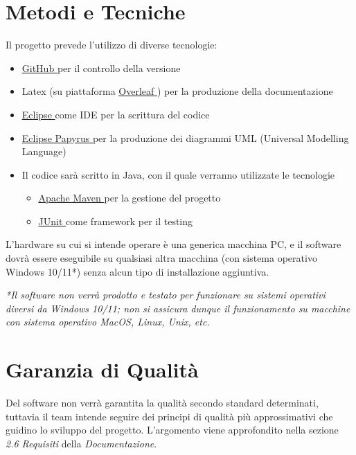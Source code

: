 \documentclass{article}
\begin{document}
\section{Metodi e Tecniche}
Il progetto prevede l'utilizzo di diverse tecnologie:
\begin{itemize}
    \item \href{http://www.github.com}{\underline{GitHub} \faExternalLink} per il controllo della versione
    \item Latex (su piattaforma \href{https://www.overleaf.com}{\underline{Overleaf} \faExternalLink}) per la produzione della documentazione
    \item \href{https://eclipseide.org/}{\underline{Eclipse} \faExternalLink} come IDE per la scrittura del codice 
    \item \href{https://eclipse.dev/papyrus/}{\underline{Eclipse Papyrus} \faExternalLink} per la produzione dei diagrammi UML (Universal Modelling Language)
    \item Il codice sarà scritto in Java, con il quale verranno utilizzate le tecnologie 
    \begin{itemize}
        \item \href{https://maven.apache.org/}{\underline{Apache Maven} \faExternalLink} per la gestione del progetto 
        \item \href{https://junit.org/junit5/}{\underline{JUnit} \faExternalLink} come framework per il testing 
    \end{itemize}
\end{itemize}
L'hardware su cui si intende operare è una generica macchina PC, e il software dovrà essere eseguibile su qualsiasi altra macchina (con sistema operativo Windows 10/11*) senza alcun tipo di installazione aggiuntiva. \newline 

\textit{*Il software non verrà prodotto e testato per funzionare su sistemi operativi diversi da Windows 10/11; non si assicura dunque il funzionamento su macchine con sistema operativo MacOS, Linux, Unix, etc.}
\section{Garanzia di Qualità}
Del software non verrà garantita la qualità secondo standard determinati, tuttavia il team intende seguire dei principi di qualità più approssimativi che guidino lo sviluppo del progetto. L'argomento viene approfondito nella sezione \textit{2.6 Requisiti} della \textit{Documentazione}.
\end{document}
